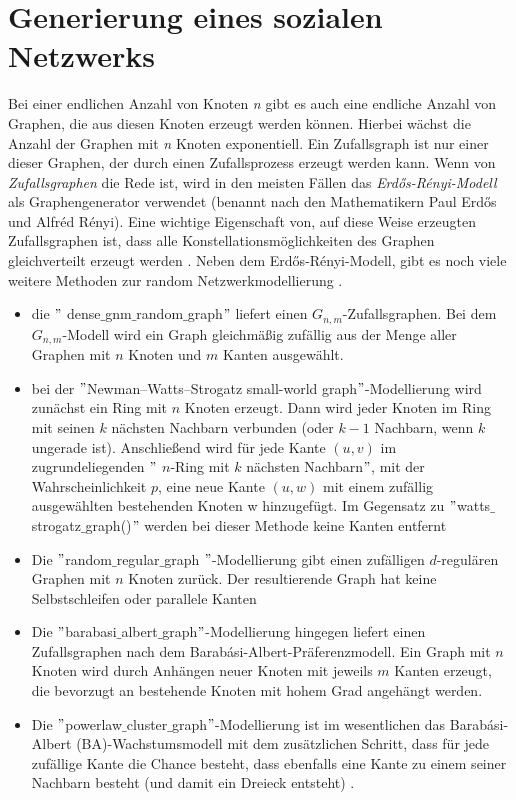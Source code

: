 \section{Generierung eines sozialen Netzwerks} 
Bei einer endlichen Anzahl von Knoten \textit{n} gibt es auch eine endliche Anzahl von Graphen, die aus diesen Knoten erzeugt werden können. Hierbei wächst die Anzahl der Graphen mit \textit{n} Knoten exponentiell.
Ein Zufallsgraph ist nur einer dieser Graphen, der durch einen Zufallsprozess erzeugt werden kann.
Wenn von \textit{Zufallsgraphen} die Rede ist, wird in den meisten Fällen das \textit{Erdős-Rényi-Modell} als Graphengenerator verwendet (benannt nach den Mathematikern Paul Erdős und Alfréd Rényi). Eine wichtige Eigenschaft von, auf diese Weise erzeugten Zufallsgraphen ist, dass alle Konstellationsmöglichkeiten des Graphen gleichverteilt erzeugt werden \cite{Generators}.
Neben dem Erdős-Rényi-Modell, gibt es noch viele weitere Methoden zur random Netzwerkmodellierung \cite{Generators}.
\begin{itemize}
    \item die $"$ dense$\_$gnm$\_$random$\_$graph$"$ liefert einen $G_{n,m}$-Zufallsgraphen.
    Bei dem $G_{n,m}$-Modell wird ein Graph gleichmäßig zufällig aus der Menge aller Graphen mit $n$ Knoten und $m$ Kanten ausgewählt.
    \item bei der $"$Newman–Watts–Strogatz small-world graph$"$-Modellierung wird zunächst ein Ring mit $n$ Knoten erzeugt. Dann wird jeder Knoten im Ring mit seinen $k$ nächsten Nachbarn verbunden (oder $k - 1$ Nachbarn, wenn $k$ ungerade ist). Anschließend wird für jede Kante $(u, v)$ im zugrundeliegenden $"$ $n$-Ring mit $k$ nächsten Nachbarn$"$, mit der Wahrscheinlichkeit $p$, eine neue Kante $(u, w)$ mit einem zufällig ausgewählten bestehenden Knoten w hinzugefügt. Im Gegensatz zu $"$watts$\_$strogatz$\_$graph()$"$ werden bei dieser Methode keine Kanten entfernt
    \item Die $"$random$\_$regular$\_$graph $"$-Modellierung gibt einen zufälligen $d$-regulären Graphen mit $n$ Knoten zurück.
    Der resultierende Graph hat keine Selbstschleifen oder parallele Kanten
    \item Die $"$barabasi$\_$albert$\_$graph$"$-Modellierung hingegen liefert einen Zufallsgraphen nach dem Barabási-Albert-Präferenzmodell.
    Ein Graph mit $n$ Knoten wird durch Anhängen neuer Knoten mit jeweils $m$ Kanten erzeugt, die bevorzugt an bestehende Knoten mit hohem Grad angehängt werden.
    \item Die $"$powerlaw$\_$cluster$\_$graph$"$-Modellierung ist im wesentlichen das Barabási-Albert (BA)-Wachstumsmodell mit dem zusätzlichen Schritt, dass für jede zufällige Kante die Chance besteht, dass ebenfalls eine Kante zu einem seiner Nachbarn besteht (und damit ein Dreieck entsteht) \cite{Generators}.
\end{itemize}

